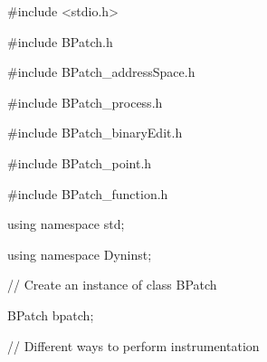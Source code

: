 {

\#include <stdio.h>}





\bigskip



{

\#include {\textquotedbl}BPatch.h{\textquotedbl}}



{

\#include {\textquotedbl}BPatch_addressSpace.h{\textquotedbl}}



{

\#include {\textquotedbl}BPatch_process.h{\textquotedbl}}



{

\#include {\textquotedbl}BPatch_binaryEdit.h{\textquotedbl}}



{

\#include {\textquotedbl}BPatch_point.h{\textquotedbl}}



{

\#include {\textquotedbl}BPatch_function.h{\textquotedbl}}





\bigskip



{

using namespace std;}



{

using namespace Dyninst;}





\bigskip



{

// Create an instance of class BPatch}



{

BPatch bpatch;}





\bigskip



{

// Different ways to perform instrumentation}



